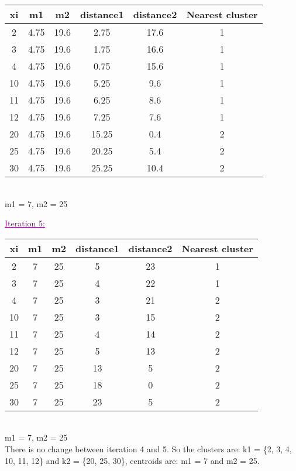 \begin{tabular} {|c|c|c|c|c|c|}
    \hline
        xi & m1 & m2 & distance1 & distance2 & Nearest cluster \\
        \hline
        \hline
        2 & 4.75 & 19.6 & 2.75 & 17.6 & 1\\
        \hline
        3 & 4.75 & 19.6 & 1.75 & 16.6 & 1\\
        \hline
        4 & 4.75 & 19.6 & 0.75 & 15.6 & 1\\
        \hline
        10 & 4.75 & 19.6 & 5.25 & 9.6 & 1\\
        \hline
        11 & 4.75 & 19.6 & 6.25 & 8.6 & 1\\
        \hline
        12 & 4.75 & 19.6 & 7.25 & 7.6 & 1\\
        \hline
        20 & 4.75 & 19.6 & 15.25 & 0.4 & 2\\
        \hline
        25 & 4.75 & 19.6 & 20.25 & 5.4 & 2\\
        \hline
        30 & 4.75 & 19.6 & 25.25 & 10.4 & 2\\
        \hline 
    \end{tabular}
\\ [5pt]
m1 = 7, m2 = 25

\textcolor{purple}{\underline{Iteration 5:}} \\

 \begin{tabular} {|c|c|c|c|c|c|}
    \hline
        xi & m1 & m2 & distance1 & distance2 & Nearest cluster \\
        \hline
        \hline
        2 & 7 & 25 & 5 & 23 & 1\\
        \hline
        3 & 7 & 25 & 4 & 22 & 1\\
        \hline
        4 & 7 & 25 & 3 & 21 & 2\\ 
        \hline
        10 & 7 & 25 & 3 & 15 & 2\\
        \hline
        11 & 7 & 25 & 4 & 14 & 2\\
        \hline
        12 & 7 & 25 & 5 & 13 & 2\\
        \hline
        20 & 7 & 25 & 13 & 5 & 2\\
        \hline
        25 & 7 & 25 & 18 & 0 & 2\\
        \hline
        30 & 7 & 25 & 23 & 5 & 2\\
        \hline 
    \end{tabular}
\\ [5pt]
m1 = 7, m2 = 25
\\ [10pt]
There is no change between iteration 4 and 5. So the clusters are: k1 = \{2, 3, 4, 10, 11, 12\} and k2 = \{20, 25, 30\}, centroids are: m1 = 7 and m2 = 25.